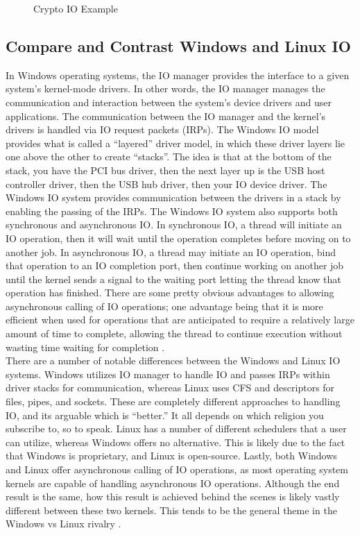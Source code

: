 \documentclass[onecolumn, draftclsnofoot,10pt, compsoc]{IEEEtran}
\begin{document}
\begin{figure}[H]
    \centering
    
    \caption{Crypto IO Example}
    \label{fig:crypto_io_ex}
\end{figure}

\subsection{Compare and Contrast Windows and Linux IO}
\noindent In Windows operating systems, the IO manager provides the interface to a given system’s kernel-mode drivers. In other words, the IO manager manages the communication and interaction between the system’s device drivers and user applications. The communication between the IO manager and the kernel’s drivers is handled via IO request packets (IRPs). The Windows IO model provides what is called a “layered” driver model, in which these driver layers lie one above the other to create “stacks”. The idea is that at the bottom of the stack, you have the PCI bus driver, then the next layer up is the USB host controller driver, then the USB hub driver, then your IO device driver. The Windows IO system provides communication between the drivers in a stack by enabling the passing of the IRPs. The Windows IO system also supports both synchronous and asynchronous IO. In synchronous IO, a thread will initiate an IO operation, then it will wait until the operation completes before moving on to another job. In asynchronous IO, a thread may initiate an IO operation, bind that operation to an IO completion port, then continue working on another job until the kernel sends a signal to the waiting port letting the thread know that operation has finished. There are some pretty obvious advantages to allowing asynchronous calling of IO operations; one advantage being that it is more efficient when used for operations that are anticipated to require a relatively large amount of time to complete, allowing the thread to continue execution without wasting time waiting for completion \cite{MSWindows1IO} \cite{MSWindows2IO} \cite{MSWindows3IO} \cite{MSWindows4IO}.\\

\noindent There are a number of notable differences between the Windows and Linux IO systems. Windows utilizes IO manager to handle IO and passes IRPs within driver stacks for communication, whereas Linux uses CFS and descriptors for files, pipes, and sockets. These are completely different approaches to handling IO, and its arguable which is “better.” It all depends on which religion you subscribe to, so to speak. Linux has a number of different schedulers that a user can utilize, whereas Windows offers no alternative. This is likely due to the fact that Windows is proprietary, and Linux is open-source. Lastly, both Windows and Linux offer asynchronous calling of IO operations, as most operating system kernels are capable of handling asynchronous IO operations. Although the end result is the same, how this result is achieved behind the scenes is likely vastly different between these two kernels. This tends to be the general theme in the Windows vs Linux rivalry \cite{Linux1IO} \cite{Linux2IO}.\\
\end{document}
